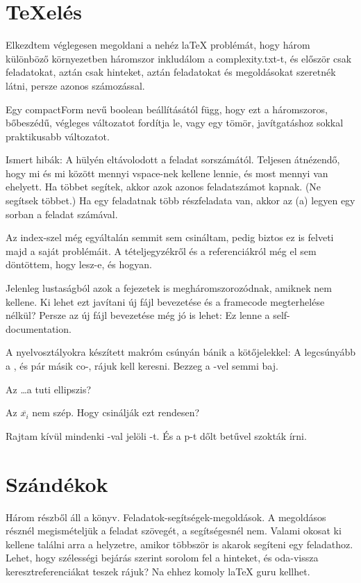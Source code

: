 \chapter{TeXelés}

Elkezdtem véglegesen megoldani a nehéz laTeX problémát, hogy három különböző környezetben háromszor inkludálom a complexity.txt-t, és először csak feladatokat, aztán csak hinteket, aztán feladatokat és megoldásokat szeretnék látni, persze azonos számozással.

Egy compactForm nevű boolean beállításától függ, hogy ezt a háromszoros, bőbeszédű, végleges változatot fordítja le, vagy egy tömör, javítgatáshoz sokkal praktikusabb változatot.

Ismert hibák: A \hard hülyén eltávolodott a feladat sorszámától. Teljesen átnézendő, hogy mi és mi között mennyi vspace-nek kellene lennie, és most mennyi van ehelyett. Ha többet segítek, akkor azok azonos feladatszámot kapnak. (Ne segítsek többet.) Ha egy feladatnak több részfeladata van, akkor az (a) legyen egy sorban a feladat számával.

Az index-szel még egyáltalán semmit sem csináltam, pedig biztos ez is felveti majd a saját problémáit. A tételjegyzékről és a referenciákról még el sem döntöttem, hogy lesz-e, és hogyan.

Jelenleg lustaságból azok a fejezetek is megháromszorozódnak, amiknek nem kellene. Ki lehet ezt javítani új fájl bevezetése és a framecode megterhelése nélkül? Persze az új fájl bevezetése még jó is lehet: Ez lenne a self-documentation.

A nyelvosztályokra készített makróm csúnyán bánik a kötőjelekkel: A legcsúnyább a \coNP, és pár másik co-, rájuk kell keresni. Bezzeg a -vel semmi baj.

Az \ldots a tuti ellipszis?

Az $\overline{x_i}$ nem szép. Hogy csinálják ezt rendesen?

Rajtam kívül mindenki {}-val jelöli \Sigmatwo-t. És a p-t dőlt betűvel szokták írni.



\chapter{Szándékok}

Három részből áll a könyv. Feladatok-segítségek-megoldások. A megoldásos résznél megismételjük a feladat szövegét, a segítségesnél nem. Valami okosat ki kellene találni arra a helyzetre, amikor többször is akarok segíteni egy feladathoz. Lehet, hogy szélességi bejárás szerint sorolom fel a hinteket, és oda-vissza keresztreferenciákat teszek rájuk? Na ehhez komoly laTeX guru kellhet.

